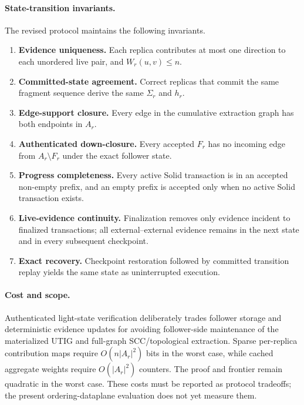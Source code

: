 \paragraph{State-transition invariants.}
The revised protocol maintains the following invariants.
\begin{enumerate}
  \item \textbf{Evidence uniqueness.} Each replica contributes at most one
        direction to each unordered live pair, and $W_r(u,v)\le n$.
  \item \textbf{Committed-state agreement.} Correct replicas that commit the
        same fragment sequence derive the same $\Sigma_r$ and $h_r$.
  \item \textbf{Edge-support closure.} Every edge in the cumulative extraction
        graph has both endpoints in $A_r$.
  \item \textbf{Authenticated down-closure.} Every accepted $F_r$ has no
        incoming edge from $A_r\setminus F_r$ under the exact follower state.
  \item \textbf{Progress completeness.} Every active Solid transaction is in
        an accepted non-empty prefix, and an empty prefix is accepted only
        when no active Solid transaction exists.
  \item \textbf{Live-evidence continuity.} Finalization removes only evidence
        incident to finalized transactions; all external--external evidence
        remains in the next state and in every subsequent checkpoint.
  \item \textbf{Exact recovery.} Checkpoint restoration followed by committed
        transition replay yields the same state as uninterrupted execution.
\end{enumerate}

\paragraph{Cost and scope.}
Authenticated light-state verification deliberately trades follower storage
and deterministic evidence updates for avoiding follower-side maintenance of
the materialized UTIG and full-graph SCC/topological extraction. Sparse
per-replica contribution maps require $O(n|A_r|^2)$ bits in the worst case,
while cached aggregate weights require $O(|A_r|^2)$ counters. The proof and
frontier remain quadratic in the worst case. These costs must be reported as
protocol tradeoffs; the present ordering-dataplane evaluation does not yet
measure them.
